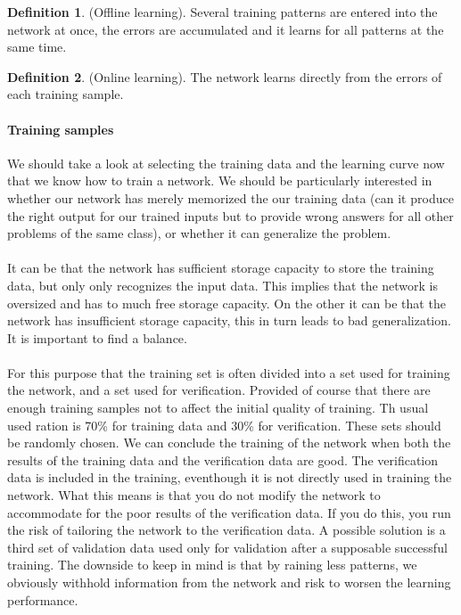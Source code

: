 \documentclass[pdftex,a4paper,12pt,twoside]{report}
\theoremstyle{plain} \newtheorem{theorem}{Theorem} \newtheorem{proposition}{Proposition} \newtheorem{lemma}{Lemma} \newtheorem*{corollary}{Corollary}
\theoremstyle{definition} \newtheorem{definition}{Definition} \newtheorem{conjecture}{Conjecture} \newtheorem*{example}{Example} \newtheorem{algorithm}{Algorithm}
\theoremstyle{remark} \newtheorem*{remark}{Remark} \newtheorem*{note}{Note} \newtheorem{case}{Case}
\begin{document}
\begin{definition}
(Offline learning). Several training patterns are entered into the
network at once, the errors are accumulated and it learns for all patterns at the same
time.
\end{definition}
\begin{definition}
(Online learning). The network learns directly from the errors of each
training sample.
\end{definition}
\paragraph{Training samples}
We should take a look at selecting the training data and the learning curve now that we know how to train a network. We should be particularly interested in whether our network has merely memorized the our training data (can it produce the right output for our trained inputs but to provide wrong answers for all other problems of the same class), or whether it can generalize the problem.\\\\It can be that the network has sufficient storage capacity to store the training data, but only only recognizes the input data. This implies that the network is oversized and has to much free storage capacity. On the other it can be that the network has insufficient storage capacity, this in turn leads to bad generalization. It is important to find a balance.\\\\For this purpose that the training set is often divided into a set used for training the network, and a set used for verification. Provided of course that there are enough training samples not to affect the initial quality of training. Th usual used ration is 70\% for training data and 30\% for verification. These sets should be randomly chosen. We can conclude the training of the network when both the results of the training data and the verification data are good. The verification data is included in the training, eventhough it is not directly used in training the network. What this means is that you do not modify the network to accommodate for the poor results of the verification data. If you do this, you run the risk of tailoring the network to the verification data. A  possible solution is a third set of validation data used only for validation after a supposable successful training. The downside to keep in mind is that by raining less patterns, we obviously withhold information from the network and risk to worsen the learning performance.
\end{document}
